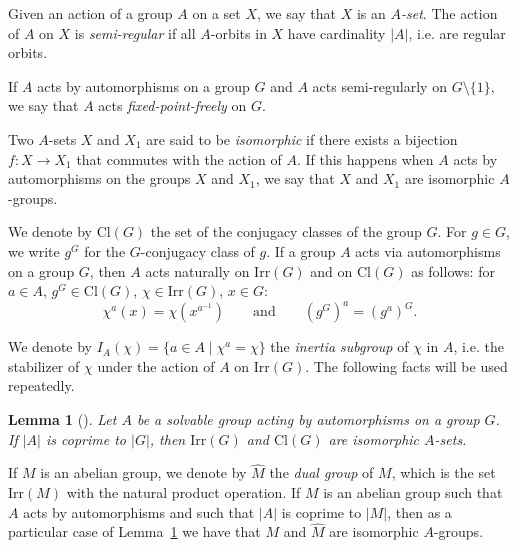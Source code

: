 \documentclass{amsart}
\newtheorem{lemma}[theorem]{Lemma}
\def\irr#1{\mathrm{Irr}(#1)}
\def\cl#1{\mathrm{Cl}(#1)}
\begin{document}
Given an action of a group $A$ on a set  $X$, we say that $X$ is an \emph{$A$-set}.
The action of $A$ on $X$ is \emph{semi-regular} if all $A$-orbits in $X$ have cardinality $|A|$, i.e. are regular orbits.

If $A$ acts by automorphisms on a group $G$ and $A$ acts semi-regularly on  $G \setminus \{1\}$, we say that
$A$ acts \emph{fixed-point-freely} on $G$.

Two $A$-sets $X$ and $X_1$ are said to be
\emph{isomorphic} if there exists a bijection $f:X \to X_1$ that commutes with the action of $A$.
If this happens when $A$ acts by automorphisms on the groups $X$ and $X_1$, we say that $X$ and $X_1$  are isomorphic $A$-groups.

We denote by $\cl G$ the set of the conjugacy classes of the group $G$.  For $g \in G$, we write $g^G$ for the $G$-conjugacy class  of $g$.
If a group $A$ acts via automorphisms on a group $G$, then $A$ acts naturally on $\irr G$ and on $\cl G$ as follows:
for $a \in A$, $g^G \in \cl G$, $\chi \in \irr G$, $x \in G$:
$$ \chi^a(x) = \chi(x^{a^{-1}}) \qquad \text{and} \qquad (g^G)^a = (g^a)^G . $$

We denote by $I_A(\chi) = \{ a\in A\mid \chi^a = \chi\}$ the \emph{inertia subgroup} of $\chi$ in $A$, i.e. the stabilizer
of $\chi$ under the action of $A$ on $\irr G$.
The following facts will be used repeatedly.

\begin{lemma}[\mbox{\cite[Theorem 13.24]{isaacs}}] \label{iso}
  Let $A$ be a solvable group acting by automorphisms on a group $G$.
  If $|A|$ is coprime to $|G|$, then $\irr G$ and $\cl G$ are isomorphic $A$-sets.
\end{lemma}

If $M$ is an abelian group, we denote by $\widehat M$ the \emph{dual group} of $M$, which is the set $\irr M$ with the natural product operation.
If $M$ is an abelian group such that $A$ acts by automorphisms and   such that $|A|$ is coprime to $|M|$, then as a particular case
of Lemma~\ref{iso} we have that $M$ and $\widehat{M}$ are isomorphic $A$-groups.
\end{document}
